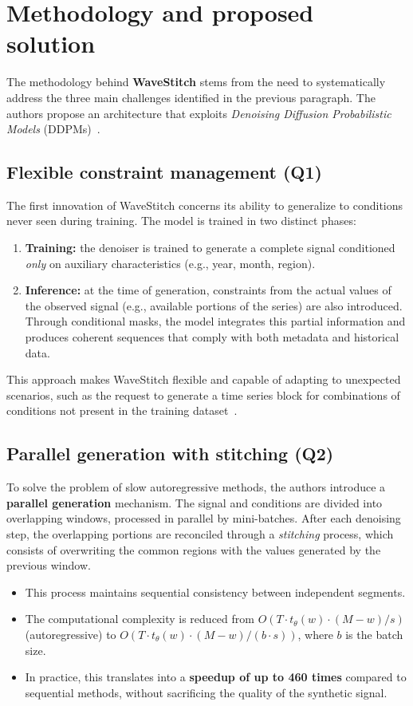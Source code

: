 \section{Methodology and proposed solution}

The methodology behind \textbf{WaveStitch} stems from the need to systematically address the three main challenges identified in the previous paragraph.  
The authors propose an architecture that exploits \emph{Denoising Diffusion Probabilistic Models} (DDPMs)~\cite{ho2020ddpm}.

\subsection{Flexible constraint management (Q1)}
The first innovation of WaveStitch concerns its ability to generalize to conditions never seen during training.  
The model is trained in two distinct phases:
\begin{enumerate}
    \item \textbf{Training:} the denoiser is trained to generate a complete signal conditioned \emph{only} on auxiliary characteristics (e.g., year, month, region).  
    \item \textbf{Inference:} at the time of generation, constraints from the actual values of the observed signal (e.g., available portions of the series) are also introduced.  
    Through conditional masks, the model integrates this partial information and produces coherent sequences that comply with both metadata and historical data.  
\end{enumerate}
This approach makes WaveStitch flexible and capable of adapting to unexpected scenarios, such as the request to generate a time series block for combinations of conditions not present in the training dataset~\cite{wavestitch}.

\subsection{Parallel generation with stitching (Q2)}
To solve the problem of slow autoregressive methods, the authors introduce a \textbf{parallel generation} mechanism.  
The signal and conditions are divided into overlapping windows, processed in parallel by mini-batches.  
After each denoising step, the overlapping portions are reconciled through a \emph{stitching} process, which consists of overwriting the common regions with the values generated by the previous window.  

\begin{itemize}
    \item This process maintains sequential consistency between independent segments.  
    \item The computational complexity is reduced from $O(T \cdot t_\theta(w) \cdot (M-w)/s)$ (autoregressive) to $O(T \cdot t_\theta(w) \cdot (M-w)/(b \cdot s))$, where $b$ is the batch size.  
    \item In practice, this translates into a \textbf{speedup of up to 460 times} compared to sequential methods, without sacrificing the quality of the synthetic signal.  
\end{itemize}

